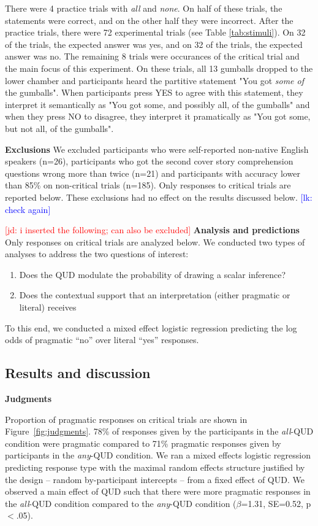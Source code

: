 \documentclass[10pt,letterpaper]{article}
\newcommand{\jd}[1]{\textcolor{Red}{[jd: #1]}}
\newcommand{\lk}[1]{\textcolor{Blue}{[lk: #1]}}
\begin{document}
There were 4 practice trials with \textit{all} and \textit{none}. On half of these trials, the statements were correct, and on the other half they were incorrect. After the practice trials, there were 72 experimental trials (see Table \ref{tab:stimuli}). On 32 of the trials, the expected answer was yes, and on 32 of the trials, the expected answer was no. The remaining 8 trials were occurances of the critical trial and the main focus of this experiment. On these trials, all 13 gumballs dropped to the lower chamber and participants heard the partitive statement "You got \textit{some of} the gumballs". When participants press YES to agree with this statement, they interpret it semantically as "You got some, and possibly all, of the gumballs" and when they press NO to disagree, they interpret it pramatically as "You got some, but not all, of the gumballs". 

\noindent \textbf{Exclusions} We excluded participants who were self-reported non-native English speakers (n=26), participants who got the second cover story comprehension questions wrong more than twice (n=21) and participants with accuracy lower than 85\% on non-critical trials (n=185). Only responses to critical trials are reported below. These exclusions had no effect on the results discussed below. \lk{check again} 

\jd{i inserted the following; can also be excluded}
\noindent \textbf{Analysis and predictions} Only responses on critical trials are analyzed below. We conducted two types of analyses to address the two questions of interest:
\begin{enumerate}
\item Does the QUD modulate the probability of drawing a scalar inference?
\item Does the contextual support that an interpretation (either pragmatic or literal) receives
\end{enumerate} 
 To this end, we conducted a mixed effect logistic regression predicting the log odds of pragmatic ``no'' over literal ``yes'' responses. 
 
\subsection{Results and discussion}

\noindent \textbf{Judgments}

Proportion of pragmatic responses on critical trials are shown in Figure~\ref{fig:judgments}. 78\% of responses given by the participants in the \textit{all}-QUD condition were pragmatic compared to 71\% pragmatic responses given by participants in the \textit{any}-QUD condition. We ran a mixed effects logistic regression predicting response type with the maximal random effects structure justified by the design --  random by-participant intercepts -- from a fixed effect of QUD.  We observed a main effect of QUD such that there were more pragmatic responses in the \textit{all}-QUD condition compared to the \textit{any}-QUD condition ($\beta$=1.31, SE=0.52, p$<$.05).
\end{document}
